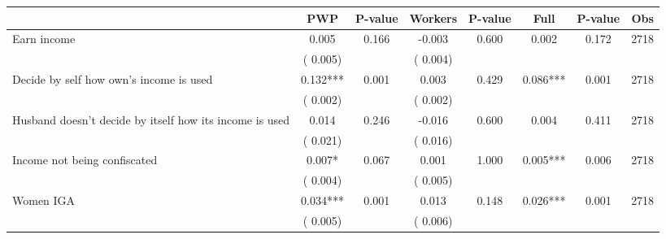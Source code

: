 
\begin{tabular}{l*{7}{c}}\hline&\multicolumn{1}{c}{PWP}&\multicolumn{1}{c}{P-value}&\multicolumn{1}{c}{Workers}&\multicolumn{1}{c}{P-value}&\multicolumn{1}{c}{Full}&\multicolumn{1}{c}{P-value}&\multicolumn{1}{c}{Obs} \\ \hline

 Earn income       &              0.005       &        0.166  &             -0.003       &        0.600  &              0.002       &              0.172 &  2718 \\ 
                       &       (       0.005)             &                               &       (       0.004)                     &                               &                                               &                                &                      \\ 

 Decide by self how own's income is used       &              0.132***       &        0.001  &              0.003       &        0.429  &              0.086***       &              0.001 &  2718 \\ 
                       &       (       0.002)             &                               &       (       0.002)                     &                               &                                               &                                &                      \\ 

 Husband doesn't decide by itself how its income is used       &              0.014       &        0.246  &             -0.016       &        0.600  &              0.004       &              0.411 &  2718 \\ 
                       &       (       0.021)             &                               &       (       0.016)                     &                               &                                               &                                &                      \\ 

 Income not being confiscated       &              0.007*       &        0.067  &              0.001       &        1.000  &              0.005***       &              0.006 &  2718 \\ 
                       &       (       0.004)             &                               &       (       0.005)                     &                               &                                               &                                &                      \\ 

 Women IGA       &              0.034***       &        0.001  &              0.013       &        0.148  &              0.026***       &              0.001 &  2718 \\ 
                       &       (       0.005)             &                               &       (       0.006)                     &                               &                                               &                                &                      \\ 

\hline \end{tabular}